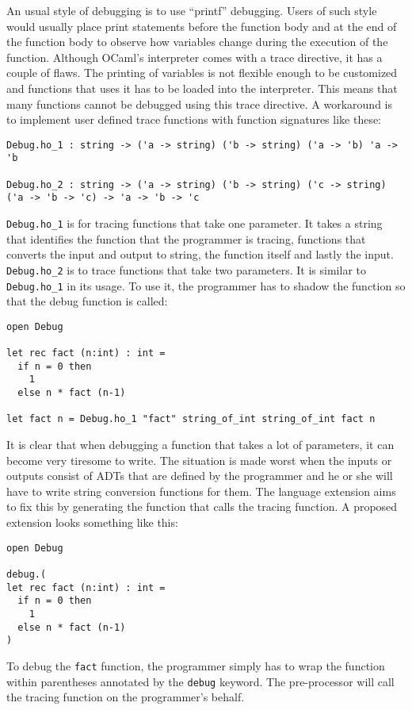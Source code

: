 \documentclass[12pt,fullpage]{article}
\begin{document}
An usual style of debugging is to use ``printf'' debugging. Users of
such style would usually place print statements before the function
body and at the end of the function body to observe how variables
change during the execution of the function. Although OCaml's
interpreter comes with a trace directive, it has a couple of
flaws. The printing of variables is not flexible enough to be
customized and functions that uses it has to be loaded into the
interpreter. This means that many functions cannot be debugged using
this trace directive. A workaround is to implement user defined
trace functions with function signatures like these:
\begin{verbatim}
Debug.ho_1 : string -> ('a -> string) ('b -> string) ('a -> 'b) 'a -> 'b

Debug.ho_2 : string -> ('a -> string) ('b -> string) ('c -> string)
('a -> 'b -> 'c) -> 'a -> 'b -> 'c
\end{verbatim}
\texttt{Debug.ho\_1} is for tracing functions that take one parameter.
It takes a string that identifies the function that the programmer is
tracing, functions that converts the input and output to string, the
function itself and lastly the input. \texttt{Debug.ho\_2} is to trace
functions that take two parameters. It is similar to
\texttt{Debug.ho\_1} in its usage. To use it, the programmer has to
shadow the function so that the debug function is called:
\begin{verbatim}
open Debug

let rec fact (n:int) : int =
  if n = 0 then
    1
  else n * fact (n-1)

let fact n = Debug.ho_1 "fact" string_of_int string_of_int fact n
\end{verbatim}
It is clear that when debugging a function that takes a lot of
parameters, it can become very tiresome to write. The situation is
made worst when the inputs or outputs consist of ADTs that are defined
by the programmer and he or she will have to write string conversion
functions for them. The language extension aims to fix this by
generating the function that calls the tracing function. A proposed
extension looks something like this:
\begin{verbatim}
open Debug

debug.(
let rec fact (n:int) : int =
  if n = 0 then
    1
  else n * fact (n-1)
)
\end{verbatim}
To debug the \texttt{fact} function, the programmer simply has to wrap
the function within parentheses annotated by the \texttt{debug}
keyword. The pre-processor will call the tracing function on the
programmer's behalf.
\end{document}
